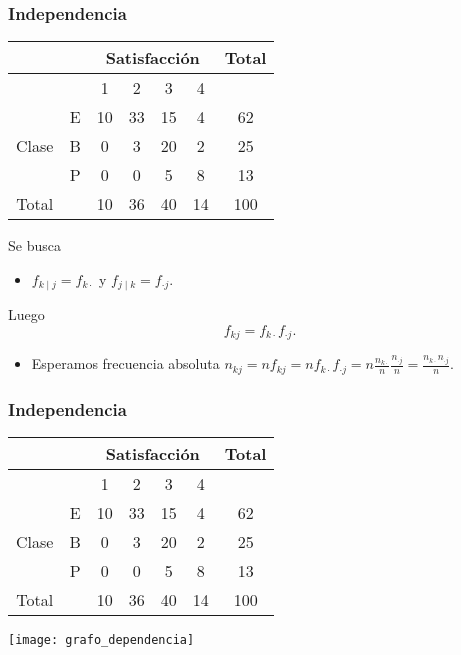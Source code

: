 \documentclass[table]{beamer}
\begin{document}
\begin{frame}
    \frametitle{Independencia}
    \begin{center}
        \begin{tabular}{c|c|cccc|c}
            & & \multicolumn{4}{c|}{Satisfacción} & Total \\
            \hline
            & & 1 & 2 & 3 & 4 & \\
            \hline
            & E & 10 & 33 & 15 & 4 & 62 \\
            Clase & B & 0 & 3 & 20 & 2 & 25 \\
            & P & 0 & 0 & 5 & 8 & 13 \\
            \hline
            Total & & 10 & 36 & 40 & 14 & 100
        \end{tabular}
    \end{center}
    \begin{block}{Se busca}
        \begin{itemize}
            \item $f_{k \mid j} = f_{k \cdot}$ y $f_{j \mid k} = f_{\cdot j}$.
        \end{itemize}
    \end{block}
    \begin{block}{Luego}
        \begin{equation*}
            f_{k j} = f_{k \cdot} f_{\cdot j} .
        \end{equation*}
        \begin{itemize}
            \item Esperamos frecuencia absoluta $n_{k j} = n f_{k j} = n f_{k \cdot} f_{\cdot j} = n \frac{n_{k \cdot}}{n} \frac{n_{\cdot j}}{n} = \frac{n_{k \cdot} n_{\cdot j}}{n}$.
        \end{itemize}
    \end{block}
\end{frame}

\begin{frame}
    \frametitle{Independencia}
    \begin{center}
        \begin{tabular}{c|c|cccc|c}
            & & \multicolumn{4}{c|}{Satisfacción} & Total \\
            \hline
            & & 1 & 2 & 3 & 4 & \\
            \hline
            & E & 10 & 33 & 15 & 4 & 62 \\
            Clase & B & 0 & 3 & 20 & 2 & 25 \\
            & P & 0 & 0 & 5 & 8 & 13 \\
            \hline
            Total & & 10 & 36 & 40 & 14 & 100
        \end{tabular}
        \texttt{[image: grafo\_dependencia]}
    \end{center}
\end{frame}
\end{document}
